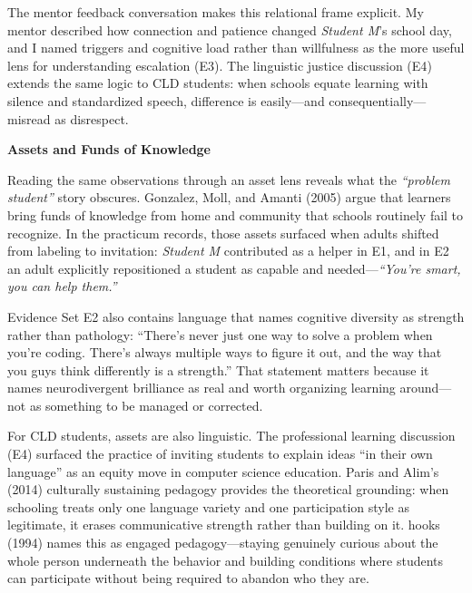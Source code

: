 \documentclass[12pt]{article}
\newcommand{\apaheading}[1]{\begin{center}\textbf{#1}\end{center}}
\newcommand{\EvidenceSet}[1]{\textsc{E#1}}
\begin{document}
The mentor feedback conversation makes this relational frame explicit. My mentor described how connection and patience changed \textit{Student M}'s school day, and I named triggers and cognitive load rather than willfulness as the more useful lens for understanding escalation (\EvidenceSet{3}). The linguistic justice discussion (\EvidenceSet{4}) extends the same logic to CLD students: when schools equate learning with silence and standardized speech, difference is easily---and consequentially---misread as disrespect.

\newpage
\apaheading{Assets and Funds of Knowledge}

Reading the same observations through an asset lens reveals what the \textit{``problem student''} story obscures. Gonzalez, Moll, and Amanti (2005) argue that learners bring funds of knowledge from home and community that schools routinely fail to recognize. In the practicum records, those assets surfaced when adults shifted from labeling to invitation: \textit{Student M} contributed as a helper in \EvidenceSet{1}, and in \EvidenceSet{2} an adult explicitly repositioned a student as capable and needed---\textit{``You're smart, you can help them.''}

Evidence Set \EvidenceSet{2} also contains language that names cognitive diversity as strength rather than pathology: ``There's never just one way to solve a problem when you're coding. There's always multiple ways to figure it out, and the way that you guys think differently is a strength.'' That statement matters because it names neurodivergent brilliance as real and worth organizing learning around---not as something to be managed or corrected.

For CLD students, assets are also linguistic. The professional learning discussion (\EvidenceSet{4}) surfaced the practice of inviting students to explain ideas ``in their own language'' as an equity move in computer science education. Paris and Alim's (2014) culturally sustaining pedagogy provides the theoretical grounding: when schooling treats only one language variety and one participation style as legitimate, it erases communicative strength rather than building on it. hooks (1994) names this as engaged pedagogy---staying genuinely curious about the whole person underneath the behavior and building conditions where students can participate without being required to abandon who they are.
\end{document}
